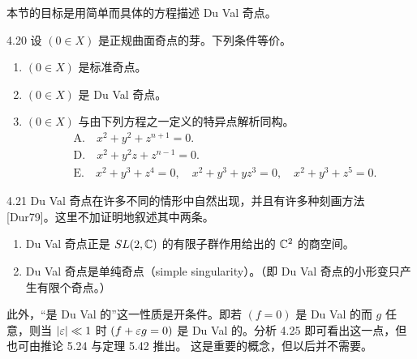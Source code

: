 本节的目标是用简单而具体的方程描述 Du Val 奇点。

\begin{theorem*}{4.20}
设 $(0\in X)$ 是正规曲面奇点的芽。下列条件等价。
\begin{enumerate}[label=(\arabic*),leftmargin=*]
\item $(0\in X)$ 是标准奇点。
\item $(0\in X)$ 是 Du Val 奇点。
\item $(0\in X)$ 与由下列方程之一定义的特异点解析同构。
\begin{align*}
&\text{A.}\quad x^2+y^2+z^{n+1}=0.\\
&\text{D.}\quad x^2+y^2z+z^{n-1}=0.\\
&\text{E.}\quad x^2+y^3+z^4=0,\quad x^2+y^3+yz^3=0,\quad x^2+y^3+z^5=0.
\end{align*}
\end{enumerate}
\end{theorem*}

\begin{remark}{4.21}
Du Val 奇点在许多不同的情形中自然出现，并且有许多种刻画方法 [Dur79]。这里不加证明地叙述其中两条。
\begin{enumerate}[label=(\arabic*),leftmargin=*]
\item Du Val 奇点正是 $SL(2,\mathbb{C})$ 的有限子群作用给出的 $\mathbb{C}^2$ 的商空间。
\item Du Val 奇点是单纯奇点（simple singularity）。（即 Du Val 奇点的小形变只产生有限个奇点。）
\end{enumerate}
此外，“是 Du Val 的”这一性质是开条件。即若 $(f=0)$ 是 Du Val 的而 $g$ 任意，则当 $|\varepsilon|\ll 1$ 时 $(f+\varepsilon g=0)$ 是 Du Val 的。分析 4.25 即可看出这一点，但也可由推论 5.24 与定理 5.42 推出。
这是重要的概念，但以后并不需要。
\end{remark}

